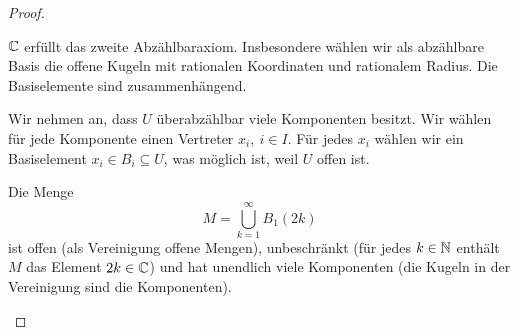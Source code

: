 \begin{proof}
	\begin{parts}
	\item $\mathbb{C}$ erfüllt das zweite Abzählbaraxiom. Insbesondere wählen wir als abzählbare Basis die offene Kugeln mit rationalen Koordinaten und rationalem Radius. Die Basiselemente sind zusammenhängend. 

	Wir nehmen an, dass $U$ überabzählbar viele Komponenten besitzt. Wir wählen für jede Komponente einen Vertreter $x_i,~i\in I$. Für jedes $x_i$ wählen wir ein Basiselement $x_i\in B_i\subseteq U$, was möglich ist, weil $U$ offen ist.
\item Die Menge
	\[
	M=\bigcup_{k=1}^\infty B_1(2k)
	\]
	ist offen (als Vereinigung offene Mengen), unbeschränkt (für jedes $k\in \mathbb{N}$ enthält $M$ das Element $2k\in \mathbb{C}$) und hat unendlich viele Komponenten (die Kugeln in der Vereinigung sind die Komponenten).
\item  
\end{parts}
\end{proof}

